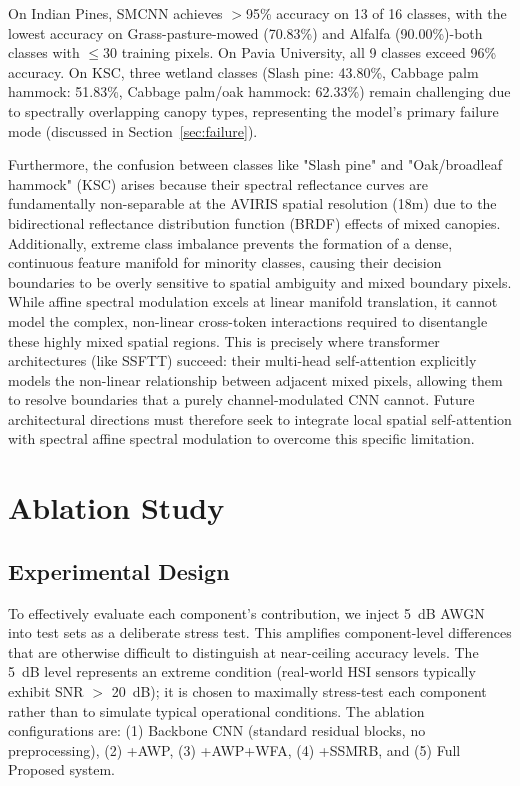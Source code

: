 \documentclass[pdflatex,sn-mathphys-num]{sn-jnl}
\theoremstyle{thmstyleone}
\theoremstyle{thmstyletwo}
\theoremstyle{thmstylethree}
\begin{document}
On Indian Pines, SMCNN achieves $>$95\% accuracy on 13 of 16 classes, with the lowest accuracy on Grass-pasture-mowed (70.83\%) and Alfalfa (90.00\%)-both classes with $\leq$30 training pixels. On Pavia University, all 9 classes exceed 96\% accuracy. On KSC, three wetland classes (Slash pine: 43.80\%, Cabbage palm hammock: 51.83\%, Cabbage palm/oak hammock: 62.33\%) remain challenging due to spectrally overlapping canopy types, representing the model's primary failure mode (discussed in Section~\ref{sec:failure}).

Furthermore, the confusion between classes like "Slash pine" and "Oak/broadleaf hammock" (KSC) arises because their spectral reflectance curves are fundamentally non-separable at the AVIRIS spatial resolution (18m) due to the bidirectional reflectance distribution function (BRDF) effects of mixed canopies. Additionally, extreme class imbalance prevents the formation of a dense, continuous feature manifold for minority classes, causing their decision boundaries to be overly sensitive to spatial ambiguity and mixed boundary pixels. While affine spectral modulation excels at linear manifold translation, it cannot model the complex, non-linear cross-token interactions required to disentangle these highly mixed spatial regions. This is precisely where transformer architectures (like SSFTT) succeed: their multi-head self-attention explicitly models the non-linear relationship between adjacent mixed pixels, allowing them to resolve boundaries that a purely channel-modulated CNN cannot. Future architectural directions must therefore seek to integrate local spatial self-attention with spectral affine spectral modulation to overcome this specific limitation.

\section{Ablation Study}

\subsection{Experimental Design}

To effectively evaluate each component's contribution, we inject 5~dB AWGN into test sets as a deliberate stress test. This amplifies component-level differences that are otherwise difficult to distinguish at near-ceiling accuracy levels. The 5~dB level represents an extreme condition (real-world HSI sensors typically exhibit SNR $>$ 20~dB); it is chosen to maximally stress-test each component rather than to simulate typical operational conditions. The ablation configurations are: (1) Backbone CNN (standard residual blocks, no preprocessing), (2) +AWP, (3) +AWP+WFA, (4) +SSMRB, and (5) Full Proposed system.
\end{document}
